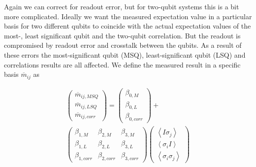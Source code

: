 Again we can correct for readout error, but for two-qubit systems this is a bit
more complicated. Ideally we want the measured expectation value in a particular
basis for two different qubits to coincide with the actual expectation values of
the most-, least significant qubit and the two-qubit correlation. But the
readout is compromised by readout error and crosstalk between the qubits. As a
result of these errors the most-significant qubit (MSQ), least-significant qubit
(LSQ) and correlations results are all affected. We
define the measured result in a specific basis $\overline{m}_{ij}$ as

\begin{equation}
\label{beta}
\begin{split}
\begin{pmatrix} \overline{m}_{ij,MSQ} \\ \overline{m}_{ij,LSQ} \\
\overline{m}_{ij,corr}
\end{pmatrix}=\begin{pmatrix} \beta_{0,M} \\ \beta_{0,L} \\ \beta_{0,corr}
\end{pmatrix}+\\\begin{pmatrix} \beta_{1,M}&\beta_{2,M}&\beta_{3,M} \\
\beta_{1,L}&\beta_{2,L}&\beta_{3,L} \\
\beta_{1,corr}&\beta_{2,corr}&\beta_{3,corr}
\end{pmatrix}\begin{pmatrix} \left\langle I\sigma_j\right\rangle \\ \left\langle
\sigma_iI\right\rangle \\ \left\langle \sigma_i\sigma_j\right\rangle
\end{pmatrix}
\end{split}
\end{equation}

